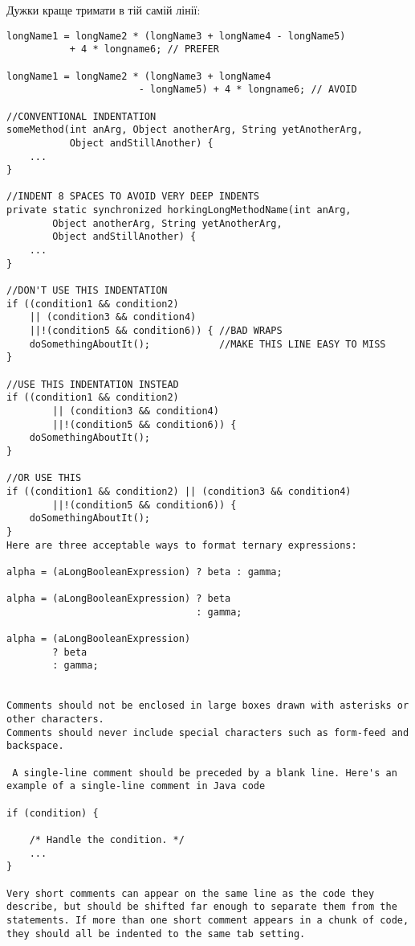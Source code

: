 Дужки краще тримати в тій самій лінії:
\begin{lstlisting}
longName1 = longName2 * (longName3 + longName4 - longName5)
           + 4 * longname6; // PREFER

longName1 = longName2 * (longName3 + longName4
                       - longName5) + 4 * longname6; // AVOID 
					   
//CONVENTIONAL INDENTATION
someMethod(int anArg, Object anotherArg, String yetAnotherArg,
           Object andStillAnother) {
    ...
}

//INDENT 8 SPACES TO AVOID VERY DEEP INDENTS
private static synchronized horkingLongMethodName(int anArg,
        Object anotherArg, String yetAnotherArg,
        Object andStillAnother) {
    ...
}

//DON'T USE THIS INDENTATION
if ((condition1 && condition2)
    || (condition3 && condition4)
    ||!(condition5 && condition6)) { //BAD WRAPS
    doSomethingAboutIt();            //MAKE THIS LINE EASY TO MISS
} 

//USE THIS INDENTATION INSTEAD
if ((condition1 && condition2)
        || (condition3 && condition4)
        ||!(condition5 && condition6)) {
    doSomethingAboutIt();
} 

//OR USE THIS
if ((condition1 && condition2) || (condition3 && condition4)
        ||!(condition5 && condition6)) {
    doSomethingAboutIt();
} 
Here are three acceptable ways to format ternary expressions:

alpha = (aLongBooleanExpression) ? beta : gamma;  

alpha = (aLongBooleanExpression) ? beta
                                 : gamma;  

alpha = (aLongBooleanExpression)
        ? beta 
        : gamma;  					   
		
		
Comments should not be enclosed in large boxes drawn with asterisks or other characters. 
Comments should never include special characters such as form-feed and backspace.

 A single-line comment should be preceded by a blank line. Here's an example of a single-line comment in Java code
 
if (condition) {

    /* Handle the condition. */
    ...
}

Very short comments can appear on the same line as the code they describe, but should be shifted far enough to separate them from the statements. If more than one short comment appears in a chunk of code, they should all be indented to the same tab setting.


\end{lstlisting}
